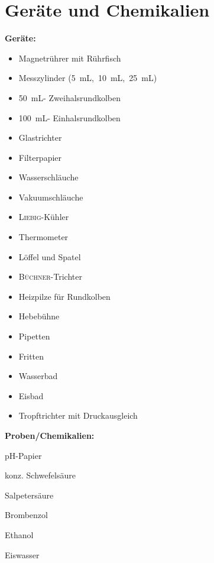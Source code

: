 \vspace*{-7mm}
\section{Geräte und Chemikalien}
\label{sec:geraete}
\vspace*{-5mm}
\textbf{Geräte:}
\begin{multicols}{3}
	\begin{itemize}
		\item Magnetrührer mit Rührfisch
		\item Messzylinder \linebreak \mbox{(\SI{5}{\milli \liter}, \SI{10}{\milli \liter}, \SI{25}{\milli \liter})}
		\item \SI{50}{\milli \liter}- \linebreak Zweihalsrundkolben
		\item \SI{100}{\milli \liter}- \linebreak Einhalsrundkolben
		\item Glastrichter
		\item Filterpapier 
		\item Wasserschläuche
		\item Vakuumschläuche
		\item \textsc{Liebig}-Kühler
		\item Thermometer
		\item Löffel und Spatel
		\item \textsc{Büchner}-Trichter
		\item Heizpilze für Rundkolben
		\item Hebebühne
		\item Pipetten
		\item Fritten
		\item Wasserbad
		\item Eisbad
		\item Tropftrichter mit Druckausgleich
	\end{itemize}
\end{multicols}


\vspace*{1mm}

\textbf{Proben/Chemikalien:}
\begin{itemize}
	\begin{minipage}{0.45 \textwidth}
		\item pH-Papier
		\item konz. Schwefelsäure
		\item Salpetersäure
	\end{minipage}
\begin{minipage}{0.45 \textwidth}
		\item Brombenzol
		\item Ethanol
		\item Eiswasser
\end{minipage}
\end{itemize}



